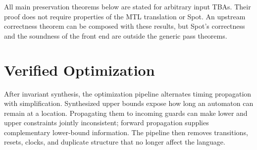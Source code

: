 \documentclass{ieeeaccess}
\begin{document}
All main preservation theorems below are stated for arbitrary input TBAs. Their proof does not require properties of the MTL translation or Spot. An upstream correctness theorem can be composed with these results, but Spot's correctness and the soundness of the front end are outside the generic pass theorems.

\section{Verified Optimization}
\label{sec:post}
After invariant synthesis, the optimization pipeline alternates timing propagation with simplification. Synthesized upper bounds expose how long an automaton can remain at a location. Propagating them to incoming guards can make lower and upper constraints jointly inconsistent; forward propagation supplies complementary lower-bound information. The pipeline then removes transitions, resets, clocks, and duplicate structure that no longer affect the language.
\end{document}

